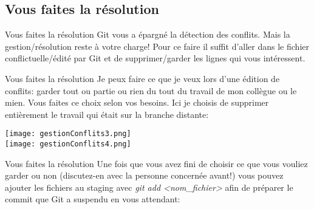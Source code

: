 \documentclass{beamer}
\begin{document}
\subsection{Vous faites la résolution}
\begin{frame}{Vous faites la résolution}
Git vous a épargné la détection des conflits. Mais la gestion/résolution reste à votre charge! Pour ce faire il suffit d'aller dans le fichier conflictuelle/édité par Git et de supprimer/garder les lignes qui vous intéressent.
\end{frame}

\begin{frame}{Vous faites la résolution}
Je peux faire ce que je veux lors d'une édition de conflits: garder tout ou partie ou rien du tout du travail de mon collègue ou le mien. Vous faites ce choix selon vos besoins. Ici je choisis de supprimer entièrement le travail qui était sur la branche distante:\\
\smallskip

\begin{center}
	\texttt{[image: gestionConflits3.png]}\\
	\vspace{0.5cm}
	\texttt{[image: gestionConflits4.png]}
\end{center}
\end{frame}

\begin{frame}[fragile]{Vous faites la résolution}
Une fois que vous avez fini de choisir ce que vous vouliez garder ou non (discutez-en avec la personne concernée avant!) vous pouvez ajouter les fichiers au staging avec \textit{git add <nom\_fichier>} afin de préparer le commit que Git a suspendu en vous attendant:

\begin{mdframed}[style=Bash]
\begin{lstlisting}[style=Bash]

\end{lstlisting}
\end{mdframed}

\end{frame}
\end{document}
